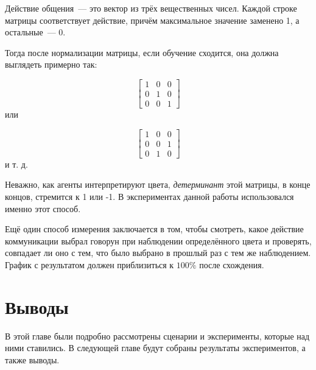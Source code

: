 Действие общения~--- это вектор из трёх вещественных чисел. Каждой строке матрицы соответствует действие, причём максимальное значение заменено 1, а остальные~--- 0.

Тогда после нормализации матрицы, если обучение сходится, она должна выглядеть примерно так:

\begin{equation*}
    \begin{bmatrix}
        1 & 0 & 0 \\
        0 & 1 & 0 \\
        0 & 0 & 1
    \end{bmatrix}
\end{equation*}
или

\begin{equation*}
    \begin{bmatrix}
        1 & 0 & 0 \\
        0 & 0 & 1 \\
        0 & 1 & 0
    \end{bmatrix}
\end{equation*}
и т. д.

Неважно, как агенты интерпретируют цвета, \textit{детерминант} этой матрицы, в конце концов, стремится к 1 или -1. В экспериментах данной работы использовался именно этот способ.

Ещё один способ измерения заключается в том, чтобы смотреть, какое действие коммуникации выбрал говорун при наблюдении определённого цвета и проверять, совпадает ли оно с тем, что было выбрано в прошлый раз с тем же наблюдением. График с результатом должен приблизиться к $100\%$ после схождения.



\section{Выводы}

В этой главе были подробно рассмотрены сценарии и эксперименты, которые над ними ставились. В следующей главе будут собраны результаты экспериментов, а также выводы.

\newpage
